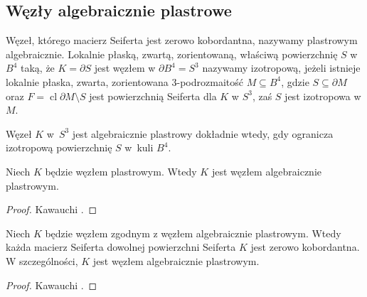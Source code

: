 
\subsection{Węzły algebraicznie plastrowe}
Węzeł, którego macierz Seiferta jest zerowo kobordantna, nazywamy plastrowym algebraicznie.
Lokalnie płaską, zwartą, zorientowaną, właściwą powierzchnię $S$ w $B^4$ taką, że $K = \partial S$ jest węzłem w $\partial B^4 = S^3$ nazywamy izotropową, jeżeli istnieje lokalnie płaska, zwarta, zorientowana 3-podrozmaitość $M \subseteq B^4$, gdzie $S \subseteq \partial M$ oraz $F = \operatorname{cl} \partial M \setminus S$ jest powierzchnią Seiferta dla $K$ w $S^3$, zaś $S$ jest izotropowa w $M$.

\begin{proposition}
    Węzeł $K$ w~$S^3$ jest algebraicznie plastrowy dokładnie wtedy, gdy ogranicza izotropową powierzchnię $S$ w~kuli $B^4$.
\end{proposition}

\begin{corollary}
    Niech $K$ będzie węzłem plastrowym.
    Wtedy $K$ jest węzłem algebraicznie plastrowym.
\end{corollary}

\begin{proof}
    Kawauchi \cite[s. 158]{kawauchi1996}.
\end{proof}

\begin{proposition}
    \label{prp:cobordant_to_algebraic_is_algebraic}
    Niech $K$ będzie węzłem zgodnym z węzłem algebraicznie plastrowym.
    Wtedy każda macierz Seiferta dowolnej powierzchni Seiferta $K$ jest zerowo kobordantna.
    W szczególności, $K$ jest węzłem algebraicznie plastrowym.
\end{proposition}

\begin{proof}
    Kawauchi \cite[s. 159]{kawauchi1996}.
\end{proof}


